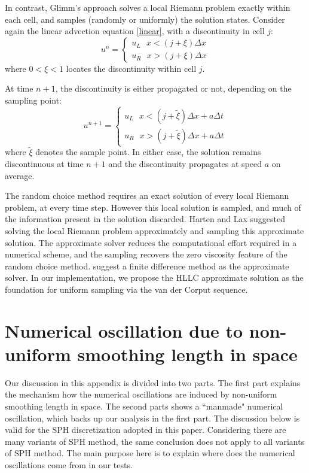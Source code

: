 \documentclass[preprint,12pt,authoryear]{elsarticle}
\begin{document}
In contrast, Glimm\rq{}s approach solves a local Riemann problem exactly within each cell,
and samples (randomly or uniformly) the solution states. Consider again the linear advection equation \ref{linear}, with a discontinuity in cell $j$:
\begin{equation}
u^n = \begin{cases}
	u_L ~~~ x< (j+\xi)\Delta x \\
 	u_R ~~~ x> (j+\xi)\Delta x
	\end{cases}			
\end{equation}
where $0<\xi<1$ locates the discontinuity within cell $j$.

At time $n+1$, the discontinuity is either propagated or not, depending on the sampling
point:
\begin{equation}
u^{n+1} = \begin{cases}
		  u_L ~~~ x< (j+\tilde \xi)\Delta x + a \Delta t \\
		  u_R ~~~ x> (j+\tilde \xi)\Delta x + a \Delta t
	        \end{cases}
\end{equation}
where $\tilde \xi$ denotes the sample point.
In either case, the solution remains discontinuous at time $n+1$ and the 
discontinuity propagates at speed $a$ on average.

The random choice method requires an exact solution of every local Riemann problem, at every time step.
However this local solution is sampled, and much of the information present in the solution discarded.
Harten and Lax \citet{harten1981random} suggested solving the local Riemann problem approximately 
and sampling this approximate solution. The approximate solver reduces the computational
effort required in a numerical scheme, and the sampling recovers the zero viscosity
feature of the random choice method. \citet{hartenlax} suggest a finite difference
method as the approximate solver.
In our implementation, we propose the HLLC approximate solution as the foundation for
uniform sampling via the van der Corput sequence.
\citep{glimm1965solutions}
\citep{colella1982glimm}
\citep{chorin1976random}
\citep{concus1979numerical}
\citep{warming1974modified}
\citep{liu1977deterministic}

\section{Numerical oscillation due to non-uniform smoothing length in space}
Our discussion in this appendix is divided into two parts. The first part explains the mechanism how the numerical oscillations are induced by non-uniform smoothing length in space. The second parts  shows a ``manmade" numerical oscillation, which backs up our analysis in the first part. The discussion below is valid for the SPH discretization adopted in this paper. Considering there are many variants of SPH method, the same conclusion does not apply to all variants of SPH method. The main purpose here is to explain where does the numerical oscillations come from in our tests. 
\end{document}
